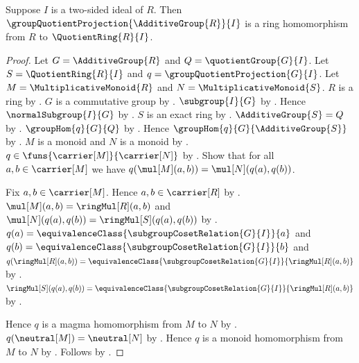 \begin{theorem}\label{quotient_ring_projection_hom}
    Suppose $I$ is a two-sided ideal of $R$.
    Then $\groupQuotientProjection{\AdditiveGroup{R}}{I}$ is a ring
        homomorphism from $R$ to $\QuotientRing{R}{I}$.
\end{theorem}
\begin{proof}
    Let $G=\AdditiveGroup{R}$ and $Q=\quotientGroup{G}{I}$.
    Let $S=\QuotientRing{R}{I}$ and $q=\groupQuotientProjection{G}{I}$.
    Let $M=\MultiplicativeMonoid{R}$ and
        $N=\MultiplicativeMonoid{S}$.
    $R$ is a ring by .
    $G$ is a commutative group by
        .
    $\subgroup{I}{G}$ by
        .
    Hence $\normalSubgroup{I}{G}$ by
        .
    $S$ is an exact ring by .
    $\AdditiveGroup{S}=Q$ by .
    $\groupHom{q}{G}{Q}$ by .
    Hence $\groupHom{q}{G}{\AdditiveGroup{S}}$ by \auto.
    $M$ is a monoid and $N$ is a monoid by
        .
    $q\in\funs{\carrier[M]}{\carrier[N]}$ by
        .
    Show that for all $a,b\in\carrier[M]$ we have
        $q(\mul[M](a,b))=\mul[N](q(a),q(b))$.
    \begin{subproof}
        Fix $a,b\in\carrier[M]$.
        Hence $a,b\in\carrier[R]$ by
            .
        $\mul[M](a,b)=\ringMul[R](a,b)$ and
            $\mul[N](q(a),q(b))=\ringMul[S](q(a),q(b))$ by
            .
        $q(a)=\equivalenceClass{\subgroupCosetRelation{G}{I}}{a}$ and
            $q(b)=\equivalenceClass{\subgroupCosetRelation{G}{I}}{b}$ and
            $q(\ringMul[R](a,b))=
                \equivalenceClass{\subgroupCosetRelation{G}{I}}{
                    \ringMul[R](a,b)}$ by
            .
        $\ringMul[S](q(a),q(b))=
            \equivalenceClass{\subgroupCosetRelation{G}{I}}{
                \ringMul[R](a,b)}$ by
            .
    \end{subproof}
    Hence $q$ is a magma homomorphism from $M$ to $N$ by
        .
    $q(\neutral[M])=\neutral[N]$ by
        .
    Hence $q$ is a monoid homomorphism from $M$ to $N$ by
        .
    Follows by .
\end{proof}

